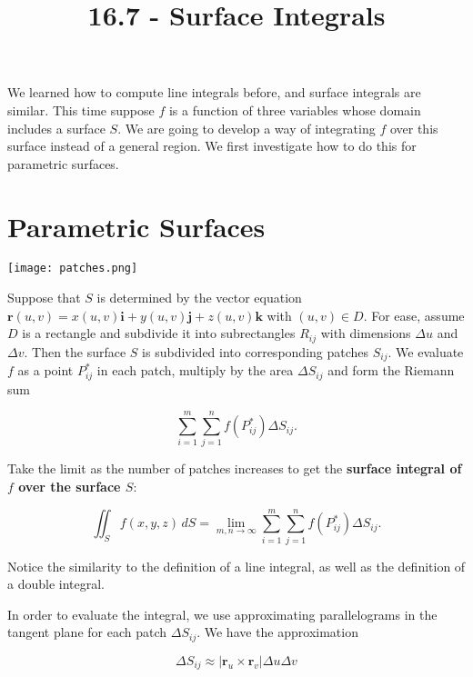 \documentclass[11pt,oneside,english]{amsart}
\theoremstyle{definition}
\newcommand{\lom}[2]{\lim_{{#1}\rightarrow{#2}}}
\begin{document}
\vspace*{-1cm}
\title{16.7 - Surface Integrals}
\maketitle


We learned how to compute line integrals before, and surface integrals are similar. This time suppose $f$ is a function of three variables whose domain includes a surface $S$. We are going to develop a way of integrating $f$ over this surface instead of a general region. We first investigate how to do this for parametric surfaces.

\section*{Parametric Surfaces}



\begin{minipage}{0.4\textwidth}
\begin{center}
\texttt{[image: patches.png]}
\end{center}
\end{minipage}%
\begin{minipage}{0.6\textwidth}
Suppose that $S$ is determined by the vector equation $\mathbf{r}(u,v)=x(u,v)\mathbf{i}+y(u,v)\mathbf{j}+z(u,v)\mathbf{k}$ with $(u,v)\in D$. For ease, assume $D$ is a rectangle and subdivide it into subrectangles $R_{ij}$ with dimensions $\Delta u$ and $\Delta v$. Then the surface $S$ is subdivided into corresponding patches $S_{ij}$. We evaluate $f$ as a point $P_{ij}^*$ in each patch, multiply by the area $\Delta S_{ij}$ and form the Riemann sum

\[
\sum_{i=1}^m\sum_{j=1}^nf(P_{ij}^*)\Delta S_{ij}.
\]

Take the limit as the number of patches increases to get the \textbf{surface integral of $f$ over the surface $S$}:

\[
\iint_Sf(x,y,z)\,dS=\lom{m,n}{\infty}\sum_{i=1}^m\sum_{j=1}^nf(P_{ij}^*)\Delta S_{ij}.
\]

Notice the similarity to the definition of a line integral, as well as the definition of a double integral.
\end{minipage}

In order to evaluate the integral, we use approximating parallelograms in the tangent plane for each patch $\Delta S_{ij}$. We have the approximation

\[
\Delta S_{ij}\approx|\mathbf{r}_u\times\mathbf{r}_v|\Delta u\Delta v
\]
\end{document}

